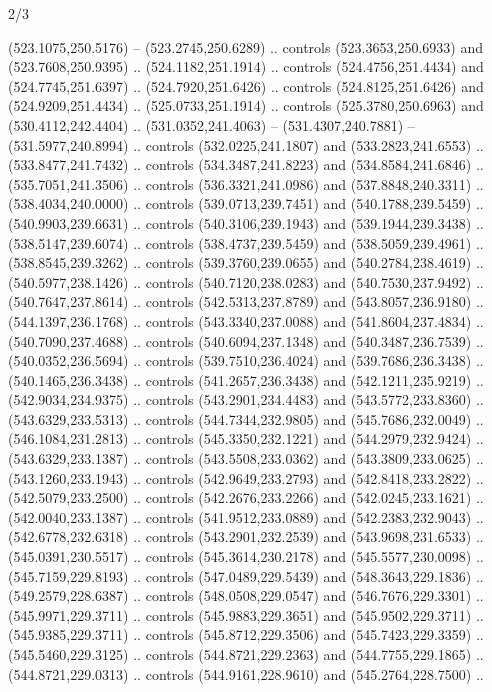 \begin{flagdescription}{2/3}
\begin{scope}[xshift=0.5\flaglength,yshift=0.5\flagwidth,scale=\flagwidth/495.65]
\begin{scope}[y=0.8pt, x=0.8pt, yscale=-1,shift={(-463.76,-309.78)}]
  (523.1075,250.5176) -- (523.2745,250.6289) .. controls (523.3653,250.6933) and
  (523.7608,250.9395) .. (524.1182,251.1914) .. controls (524.4756,251.4434) and
  (524.7745,251.6397) .. (524.7920,251.6426) .. controls (524.8125,251.6426) and
  (524.9209,251.4434) .. (525.0733,251.1914) .. controls (525.3780,250.6963) and
  (530.4112,242.4404) .. (531.0352,241.4063) -- (531.4307,240.7881) --
  (531.5977,240.8994) .. controls (532.0225,241.1807) and (533.2823,241.6553) ..
  (533.8477,241.7432) .. controls (534.3487,241.8223) and (534.8584,241.6846) ..
  (535.7051,241.3506) .. controls (536.3321,241.0986) and (537.8848,240.3311) ..
  (538.4034,240.0000) .. controls (539.0713,239.7451) and (540.1788,239.5459) ..
  (540.9903,239.6631) .. controls (540.3106,239.1943) and (539.1944,239.3438) ..
  (538.5147,239.6074) .. controls (538.4737,239.5459) and (538.5059,239.4961) ..
  (538.8545,239.3262) .. controls (539.3760,239.0655) and (540.2784,238.4619) ..
  (540.5977,238.1426) .. controls (540.7120,238.0283) and (540.7530,237.9492) ..
  (540.7647,237.8614) .. controls (542.5313,237.8789) and (543.8057,236.9180) ..
  (544.1397,236.1768) .. controls (543.3340,237.0088) and (541.8604,237.4834) ..
  (540.7090,237.4688) .. controls (540.6094,237.1348) and (540.3487,236.7539) ..
  (540.0352,236.5694) .. controls (539.7510,236.4024) and (539.7686,236.3438) ..
  (540.1465,236.3438) .. controls (541.2657,236.3438) and (542.1211,235.9219) ..
  (542.9034,234.9375) .. controls (543.2901,234.4483) and (543.5772,233.8360) ..
  (543.6329,233.5313) .. controls (544.7344,232.9805) and (545.7686,232.0049) ..
  (546.1084,231.2813) .. controls (545.3350,232.1221) and (544.2979,232.9424) ..
  (543.6329,233.1387) .. controls (543.5508,233.0362) and (543.3809,233.0625) ..
  (543.1260,233.1943) .. controls (542.9649,233.2793) and (542.8418,233.2822) ..
  (542.5079,233.2500) .. controls (542.2676,233.2266) and (542.0245,233.1621) ..
  (542.0040,233.1387) .. controls (541.9512,233.0889) and (542.2383,232.9043) ..
  (542.6778,232.6318) .. controls (543.2901,232.2539) and (543.9698,231.6533) ..
  (545.0391,230.5517) .. controls (545.3614,230.2178) and (545.5577,230.0098) ..
  (545.7159,229.8193) .. controls (547.0489,229.5439) and (548.3643,229.1836) ..
  (549.2579,228.6387) .. controls (548.0508,229.0547) and (546.7676,229.3301) ..
  (545.9971,229.3711) .. controls (545.9883,229.3651) and (545.9502,229.3711) ..
  (545.9385,229.3711) .. controls (545.8712,229.3506) and (545.7423,229.3359) ..
  (545.5460,229.3125) .. controls (544.8721,229.2363) and (544.7755,229.1865) ..
  (544.8721,229.0313) .. controls (544.9161,228.9610) and (545.2764,228.7500) ..

\end{scope}
\end{scope}
\end{flagdescription}
